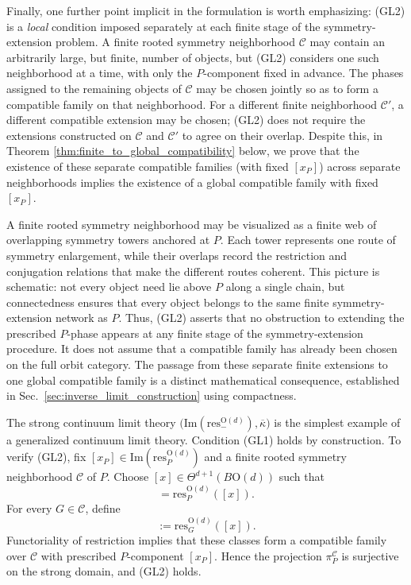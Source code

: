\documentclass[aps,prx,reprint,superscriptaddress,twocolumn,amsmath,amssymb,amsfonts, nofootinbib]{revtex4-2}
\newcommand{\res}{\text{res}}
\theoremstyle{apsstyle}
\begin{document}
\bigskip 

Finally, one further point implicit in the formulation is worth emphasizing: {\rm(GL2)} is a \textit{local} condition imposed separately at each finite stage of the symmetry-extension problem. A finite rooted symmetry neighborhood $\mathcal C$ may contain an arbitrarily large, but finite, number of objects, but {\rm(GL2)} considers one such neighborhood at a time, with only the $P$-component fixed in advance. The phases assigned to the remaining objects of $\mathcal C$ may be chosen jointly so as to form a compatible family on that neighborhood. For a different finite neighborhood $\mathcal C'$, a different compatible extension may be chosen; {\rm(GL2)} does not require the extensions constructed on $\mathcal C$ and $\mathcal C'$ to agree on their overlap. Despite this, in Theorem \ref{thm:finite_to_global_compatibility} below, we prove that the existence of these separate compatible families (with fixed $[x_{P}]$) across separate neighborhoods implies the existence of a global compatible family with fixed $[x_{P}]$.

\medskip

A finite rooted symmetry neighborhood may be visualized as a finite web of overlapping symmetry towers anchored at $P$. Each tower represents one route of symmetry enlargement, while their overlaps record the restriction and conjugation relations that make the different routes coherent. This picture is schematic: not every object need lie above $P$ along a single chain, but connectedness ensures that every object belongs to the same finite symmetry-extension network as $P$. Thus, (GL2) asserts that no obstruction to extending the prescribed $P$-phase appears at any finite stage of the symmetry-extension procedure. It does not assume that a compatible family has already been chosen on the full orbit category. The passage from these separate finite extensions to one global compatible family is a distinct mathematical consequence, established in Sec.~\ref{sec:inverse_limit_construction} using compactness.


\bigskip

The strong continuum limit theory $\bigl(\mathrm{Im}(\res^{\mathrm{O}(d)}_{-}),\overline{\kappa}\bigr)$ is the simplest example of a generalized continuum limit theory. Condition (GL1) holds by construction. To verify (GL2), fix $[x_P]\in\mathrm{Im}(\res^{\mathrm{O}(d)}_P)$ and a finite rooted symmetry neighborhood $\mathcal C$ of $P$. Choose $[x]\in\Theta^{d+1}(B\mathrm{O}(d))$ such that
\begin{equation*}
[x_P]=\res_P^{\mathrm{O}(d)}([x]).
\end{equation*}
For every $G\in\mathcal C$, define
\begin{equation*}
[x_G]:=\res_G^{\mathrm{O}(d)}([x]).
\end{equation*}
Functoriality of restriction implies that these classes form a compatible family over $\mathcal C$ with prescribed $P$-component $[x_P]$. Hence the projection $\pi_P^{\mathcal C}$ is surjective on the strong domain, and (GL2) holds.
\end{document}
